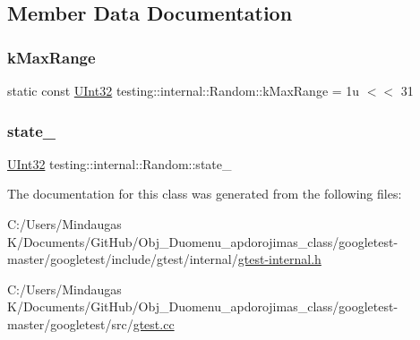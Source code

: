 \subsection{Member Data Documentation}
\mbox{\label{classtesting_1_1internal_1_1_random_ad378599ead1173525f1d44b458a3450a}} 
\subsubsection{\texorpdfstring{kMaxRange}{kMaxRange}}
{\footnotesize\ttfamily static const \mbox{\hyperlink{namespacetesting_1_1internal_a436defbb8e92c8e94e33ebcc86f278ba}{U\+Int32}} testing\+::internal\+::\+Random\+::k\+Max\+Range = 1u $<$$<$ 31\hspace{0.3cm}{\ttfamily [static]}}

\mbox{\label{classtesting_1_1internal_1_1_random_ad500e33e3342415afb8a3ab242afa9cc}} 
\subsubsection{\texorpdfstring{state\_}{state\_}}
{\footnotesize\ttfamily \mbox{\hyperlink{namespacetesting_1_1internal_a436defbb8e92c8e94e33ebcc86f278ba}{U\+Int32}} testing\+::internal\+::\+Random\+::state\+\_\+\hspace{0.3cm}{\ttfamily [private]}}



The documentation for this class was generated from the following files\+:\begin{DoxyCompactItemize}
\item 
C\+:/\+Users/\+Mindaugas K/\+Documents/\+Git\+Hub/\+Obj\+\_\+\+Duomenu\+\_\+apdorojimas\+\_\+class/googletest-\/master/googletest/include/gtest/internal/\mbox{\hyperlink{googletest-master_2googletest_2include_2gtest_2internal_2gtest-internal_8h}{gtest-\/internal.\+h}}\item 
C\+:/\+Users/\+Mindaugas K/\+Documents/\+Git\+Hub/\+Obj\+\_\+\+Duomenu\+\_\+apdorojimas\+\_\+class/googletest-\/master/googletest/src/\mbox{\hyperlink{googletest-master_2googletest_2src_2gtest_8cc}{gtest.\+cc}}\end{DoxyCompactItemize}
